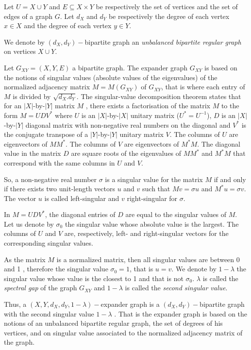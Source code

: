 Let $U=X \cup Y$ and $E\subseteq X\times Y$ be respectively the set of vertices and the set of edges of a graph $G.$ Let $d_X$ and $d_Y$  be respectively the degree of each vertex $x\in X$ and the degree of each vertex $y \in Y.$

We denote by $(d_X,d_Y)-$bipartite graph an \textit{unbalanced bipartite regular graph} on vertices $X \cup Y.$ 

Let $G_{XY}=(X,Y,E)$ a bipartite graph. The expander graph $G_{XY}$ is based on the notions of  singular values (absolute values of the eigenvalues) of the normalized adjacency matrix $M=M(G_{XY})$ of $G_{XY}$, that is where each entry of $M$ is divided by $\sqrt{d_X.d_Y}.$ The singular-value decomposition theorem states that for an $|X|$-by-$|Y|$
 matrix $M$ , there exists a factorisation of the matrix $M$ to the form $M=UDV^*$ where $U$ is an $|X|$-by-$|X|$ unitary matrix ($U^*=U^{-1}$), $D$ is an $|X|$-by-$|Y|$ diagonal matrix with non-negative real numbers on the diagonal and $V^*$ is the conjugate transpose of a $|Y|$-by-$|Y|$ unitary matrix $V$. The columns of $U$ are  eigenvectors of $MM^*$. The columns of $V$ are  eigenvectors of $M^*M$. The diagonal value in the matrix $D$ are square roots of the eigenvalues of $MM^*$ and $M^*M$ that correspond with the same columns in $U$ and $V.$

 So, a non-negative real number $\sigma$ is a singular value for the matrix $M$ if and only if there exists two unit-length vectors $u$ and $v$ such that $Mv=\sigma u$ and $M^*u=\sigma v.$ The vector $u$ is called left-singular and $v$ right-singular for $\sigma.$
 
In $M=UDV^*$, the diagonal entries of $D$ are equal to the singular values of $M.$
 Let us denote by $\sigma_0$ the singular value whose absolute value is the largest. The columns of $U$ and $V$ are, respectively, left- and right-singular vectors for the corresponding singular values.
 
   As the matrix $M$ is a normalized matrix, then all singular values are between 0 and 1 , therefore the singular value $\sigma_0=1$, that is $u=v.$ 
We denote by $1-\lambda$ the singular value whose value is the closest to 1 and that is not $\sigma_0$. $\lambda$ is called the \textit{spectral gap} of the graph $G_{XY}$ and $1-\lambda$ is called the \textit{second singular value}.

Thus, a $(X,Y,d_X,d_Y,1-\lambda)-$expander graph is a
$(d_X,d_Y)-$bipartite graph
with the second singular value $1-\lambda$ \citep{raz2012strong}. That is the expander graph is based on the notions of an unbalanced bipartite regular graph, the set of  degrees of his vertices, and  on  singular value  associated to the normalized adjacency matrix  of the graph.

